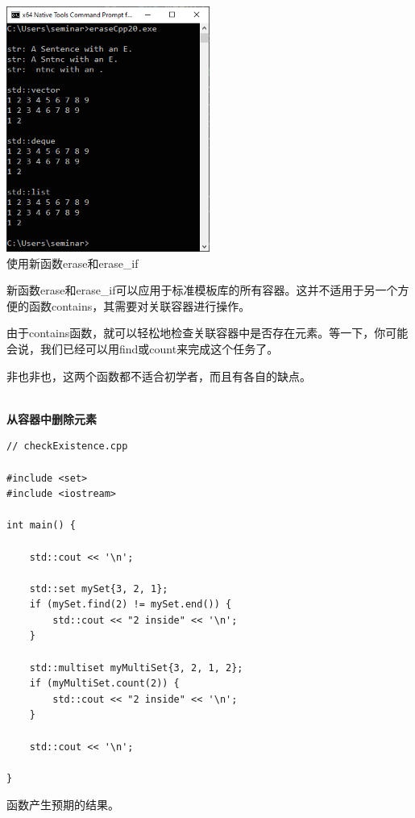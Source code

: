 \begin{center}
\includegraphics[width=0.5\textwidth]{content/3/chapter5/images/13.png}\\
使用新函数erase和erase\_if
\end{center}

新函数erase和erase\_if可以应用于标准模板库的所有容器。这并不适用于另一个方便的函数contains，其需要对关联容器进行操作。


由于contains函数，就可以轻松地检查关联容器中是否存在元素。等一下，你可能会说，我们已经可以用find或count来完成这个任务了。

非也非也，这两个函数都不适合初学者，而且有各自的缺点。

\hspace*{\fill} \\ %
\noindent
\textbf{从容器中删除元素}
\begin{lstlisting}[style=styleCXX]
// checkExistence.cpp

#include <set>
#include <iostream>

int main() {

	std::cout << '\n';
	
	std::set mySet{3, 2, 1};
	if (mySet.find(2) != mySet.end()) {
		std::cout << "2 inside" << '\n';
	}
	
	std::multiset myMultiSet{3, 2, 1, 2};
	if (myMultiSet.count(2)) {
		std::cout << "2 inside" << '\n';
	}
	
	std::cout << '\n';

}
\end{lstlisting}

函数产生预期的结果。

